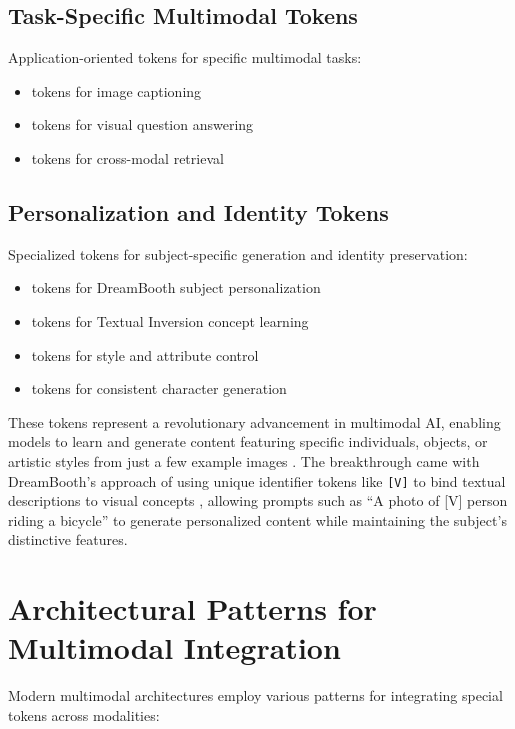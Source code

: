\subsection{Task-Specific Multimodal Tokens}
Application-oriented tokens for specific multimodal tasks:
\begin{itemize}
\item {} tokens for image captioning
\item {} tokens for visual question answering
\item {} tokens for cross-modal retrieval
\end{itemize}

\subsection{Personalization and Identity Tokens}
Specialized tokens for subject-specific generation and identity preservation:
\begin{itemize}
\item {} tokens for DreamBooth subject personalization
\item {} tokens for Textual Inversion concept learning
\item {} tokens for style and attribute control
\item {} tokens for consistent character generation
\end{itemize}

These tokens represent a revolutionary advancement in multimodal AI, enabling models to learn and generate content featuring specific individuals, objects, or artistic styles from just a few example images \citep{ruiz2022dreambooth, gal2022image}. The breakthrough came with DreamBooth's approach of using unique identifier tokens like \texttt{[V]} to bind textual descriptions to visual concepts \citep{ruiz2022dreambooth}, allowing prompts such as ``A photo of [V] person riding a bicycle'' to generate personalized content while maintaining the subject's distinctive features.

\section{Architectural Patterns for Multimodal Integration}

Modern multimodal architectures employ various patterns for integrating special tokens across modalities:

